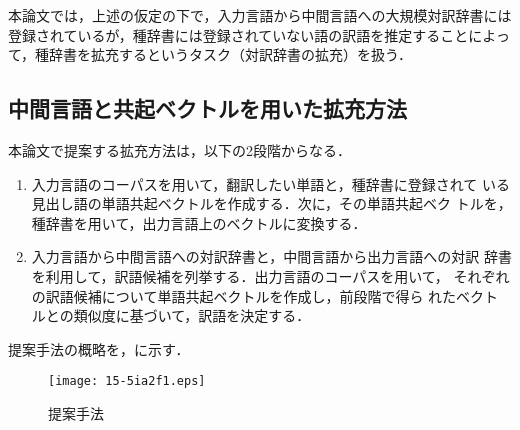 \documentclass[japanese]{jnlp_1.4}
\newcommand{\figref}[1]{}
\begin{document}
本論文では，上述の仮定の下で，入力言語から中間言語への大規模対訳辞書には
登録されているが，種辞書には登録されていない語の訳語を推定することによっ
て，種辞書を拡充するというタスク（対訳辞書の拡充）を扱う．


\subsection{中間言語と共起ベクトルを用いた拡充方法}
\label{subsec:提案手法}

本論文で提案する拡充方法は，以下の2段階からなる．
\begin{enumerate}
  \item 入力言語のコーパスを用いて，翻訳したい単語と，種辞書に登録されて
	いる見出し語の単語共起ベクトルを作成する．次に，その単語共起ベク
	トルを，種辞書を用いて，出力言語上のベクトルに変換する．
  \item 入力言語から中間言語への対訳辞書と，中間言語から出力言語への対訳
	辞書を利用して，訳語候補を列挙する．出力言語のコーパスを用いて，
	それぞれの訳語候補について単語共起ベクトルを作成し，前段階で得ら
	れたベクトルとの類似度に基づいて，訳語を決定する．
\end{enumerate}
提案手法の概略を，\figref{fig:提案手法}に示す．

\begin{figure}[b]
  \begin{center}
   \texttt{[image: 15-5ia2f1.eps]}
    \caption{提案手法}
    \label{fig:提案手法}
  \end{center}
\end{figure}
\end{document}
